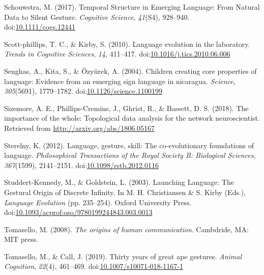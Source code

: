 \documentclass[
  man, noextraspace,floatsintext]{apa6}
\newlength{\cslhangindent}
\newenvironment{cslreferences}%
  {\setlength{\parindent}{0pt}%
  \everypar{\setlength{\hangindent}{\cslhangindent}}\ignorespaces}%
  {\par}
\begin{document}
\begin{cslreferences}
\leavevmode\hypertarget{ref-schouwstraTemporalStructureEmerging2017}{}%
Schouwstra, M. (2017). Temporal Structure in Emerging Language: From Natural Data to Silent Gesture. \emph{Cognitive Science}, \emph{41}(S4), 928--940. doi:\href{https://doi.org/10.1111/cogs.12441}{10.1111/cogs.12441}

\leavevmode\hypertarget{ref-scott-phillipsLanguageEvolutionLaboratory2010}{}%
Scott-phillips, T. C., \& Kirby, S. (2010). Language evolution in the laboratory. \emph{Trends in Cognitive Sciences}, \emph{14}, 411--417. doi:\href{https://doi.org/10.1016/j.tics.2010.06.006}{10.1016/j.tics.2010.06.006}

\leavevmode\hypertarget{ref-senghasChildrenCreatingCore2004}{}%
Senghas, A., Kita, S., \& Özyürek, A. (2004). Children creating core properties of language: Evidence from an emerging sign language in nicaragua. \emph{Science}, \emph{305}(5691), 1779--1782. doi:\href{https://doi.org/10.1126/science.1100199}{10.1126/science.1100199}

\leavevmode\hypertarget{ref-sizemoreImportanceWholeTopological2018}{}%
Sizemore, A. E., Phillips-Cremins, J., Ghrist, R., \& Bassett, D. S. (2018). The importance of the whole: Topological data analysis for the network neuroscientist. Retrieved from \url{http://arxiv.org/abs/1806.05167}

\leavevmode\hypertarget{ref-sterelnyLanguageGestureSkill2012}{}%
Sterelny, K. (2012). Language, gesture, skill: The co-evolutionary foundations of language. \emph{Philosophical Transactions of the Royal Society B: Biological Sciences}, \emph{367}(1599), 2141--2151. doi:\href{https://doi.org/10.1098/rstb.2012.0116}{10.1098/rstb.2012.0116}

\leavevmode\hypertarget{ref-studdert-kennedyLaunchingLanguageGestural2003}{}%
Studdert-Kennedy, M., \& Goldstein, L. (2003). Launching Language: The Gestural Origin of Discrete Infinity. In M. H. Christiansen \& S. Kirby (Eds.), \emph{Language Evolution} (pp. 235--254). Oxford University Press. doi:\href{https://doi.org/10.1093/acprof:oso/9780199244843.003.0013}{10.1093/acprof:oso/9780199244843.003.0013}

\leavevmode\hypertarget{ref-tomaselloOriginsHumanCommunication2008}{}%
Tomasello, M. (2008). \emph{The origins of human communication}. Cambdride, MA: MIT press.

\leavevmode\hypertarget{ref-tomaselloThirtyYearsGreat2019}{}%
Tomasello, M., \& Call, J. (2019). Thirty years of great ape gestures. \emph{Animal Cognition}, \emph{22}(4), 461--469. doi:\href{https://doi.org/10.1007/s10071-018-1167-1}{10.1007/s10071-018-1167-1}


\end{cslreferences}
\end{document}
